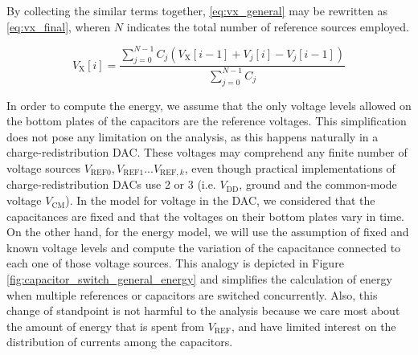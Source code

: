\documentclass[]{article}
\newcommand{\figref}[1]{Figure \ref{#1}}
\newcommand{\vref}{\ensuremath{V_\mathrm{REF}}}
\newcommand{\vcm}{\ensuremath{V_\mathrm{CM}}}
\newcommand{\vdd}{\ensuremath{V_\mathrm{DD}}}
\begin{document}
By collecting the similar terms together, \eqref{eq:vx_general} may be rewritten as \eqref{eq:vx_final}, wheren $N$ indicates the total number of reference sources employed.

\begin{equation}
	V_\mathrm{X}[i]=  \dfrac{\displaystyle\sum_{j=0}^{N-1}C_j(V_\mathrm{X}[i-1]+V_j[i]-V_j[i-1]) }{\displaystyle\sum_{j=0}^{N-1} C_j}
	\label{eq:vx_final}
\end{equation}


In order to compute the energy, we assume that the only voltage levels allowed on the bottom plates of the capacitors are the reference voltages. This simplification does not pose any limitation on the analysis, as this happens naturally in a charge-redistribution DAC. These voltages may comprehend any finite number of voltage sources $V_\mathrm{REF0}, V_\mathrm{REF1}...V_{\mathrm{REF},k}$, even though practical implementations of charge-redistribution DACs use 2 or 3 (i.e. $\vdd$, ground and the common-mode voltage $\vcm$). In the model for voltage in the DAC, we considered that the capacitances are fixed and that the voltages on their bottom plates vary in time. On the other hand, for the energy model, we will use the assumption of fixed and known voltage levels and compute the variation of the capacitance connected to each one of those voltage sources. This analogy is depicted in \figref{fig:capacitor_switch_general_energy} and simplifies the calculation of energy when multiple references or capacitors are switched concurrently. Also, this change of standpoint is not harmful to the analysis because we care most about the amount of energy that is spent from $\vref$, and have limited interest on the distribution of currents among the capacitors.
\end{document}
